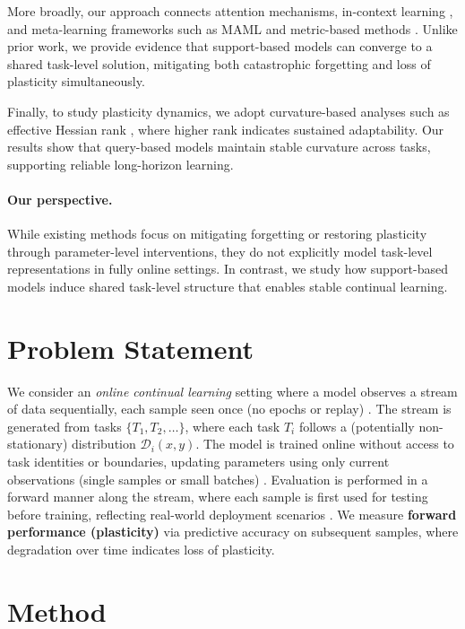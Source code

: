 \documentclass{article}
\begin{document}
More broadly, our approach connects attention mechanisms, in-context learning \citep{dong2024survey, wu2025why, ahn2023transformers}, and meta-learning frameworks such as MAML \citep{finn2017maml} and metric-based methods \citep{vinyals2016matching, koch2015siamese, snell2017prototypical}. Unlike prior work, we provide evidence that support-based models can converge to a shared task-level solution, mitigating both catastrophic forgetting and loss of plasticity simultaneously.

Finally, to study plasticity dynamics, we adopt curvature-based analyses such as effective Hessian rank \citep{lewandowski2023curvature, roy2007effective}, where higher rank indicates sustained adaptability. Our results show that query-based models maintain stable curvature across tasks, supporting reliable long-horizon learning.


\paragraph{Our perspective.}
While existing methods focus on mitigating forgetting or restoring plasticity through parameter-level interventions, they do not explicitly model task-level representations in fully online settings. In contrast, we study how support-based models induce shared task-level structure that enables stable continual learning.


\section{Problem Statement}
We consider an \textit{online continual learning} setting where a model observes a stream of data sequentially, each sample seen once (no epochs or replay) \citep{cai2021online}. The stream is generated from tasks $\{T_1, T_2, \dots\}$, where each task $T_i$ follows a (potentially non-stationary) distribution $\mathcal{D}_i(x,y)$. The model is trained online without access to task identities or boundaries, updating parameters using only current observations (single samples or small batches) \citep{koh2021online}. Evaluation is performed in a forward manner along the stream, where each sample is first used for testing before training, reflecting real-world deployment scenarios \citep{cai2021online, lin2022clear}. We measure \textbf{forward performance (plasticity)} via predictive accuracy on subsequent samples, where degradation over time indicates loss of plasticity.


\section{Method}
\end{document}
